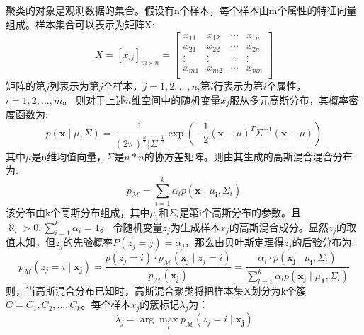 \documentclass[lang=cn,a4paper,cite=authoryear]{elegantpaper}
\begin{document}
\subsection*{}
聚类的对象是观测数据的集合。假设有n个样本，每个样本由m个属性的特征向量组成。样本集合可以表示为矩阵X:
$$
X=\left[ x_{ij} \right] _{m\times n}=\left[ \begin{matrix}
	x_{11}&		x_{12}&		\cdots&		x_{1n}\\
	x_{21}&		x_{22}&		\cdots&		x_{2n}\\
	\vdots&		\vdots&		\ddots&		\vdots\\
	x_{m1}&		x_{m2}&		\cdots&		x_{mn}\\
\end{matrix} \right] 
$$
矩阵的第$j$列表示为第$j$个样本，$j=1,2,...,n$;第$i$行表示为第$i$个属性，$i=1,2,...,m$。
则对于上述$n$维空间中的随机变量$x_j$服从多元高斯分布，其概率密度函数为:
\begin{equation}
	p(\mathbf{x} \mid \mu, \Sigma)=\frac{1}{(2 \pi)^{\frac{n}{2}}|\Sigma|^{\frac{1}{2}}} \exp \left(-\frac{1}{2}(\mathbf{x}-\mu)^{T} \Sigma^{-1}(\mathbf{x}-\mu)\right)
\end{equation}
其中$\mu$是n维均值向量，$\Sigma$是$n*n$的协方差矩阵。则由其生成的高斯混合混合分布为:
\begin{equation}
	p_{\mathcal{M}}=\sum_{i=1}^{k} \alpha_{i} p\left(\mathbf{x} \mid \mu_{\mathbf{i}}, \Sigma_{i}\right)
\end{equation}
该分布由k个高斯分布组成，其中$\mu_i$和$\Sigma_i$是第i个高斯分布的参数。且$\aleph_i>0,\sum_{i=1}^{k} \alpha_{i}=1$。
令随机变量$z_j$为生成样本$x_j$的高斯混合成分。显然$z_j$的取值未知，但$z_j$的先验概率$P(z_j=j)=\alpha_{j}$，那么由贝叶斯定理得$z_j$的后验分布为:
\begin{equation}
	p_{\mathcal{M}}\left(z_{j}=i \mid \mathbf{x}_{\mathbf{j}}\right)=\frac{p\left(z_{j}=i\right) \cdot p_{\mathcal{M}}\left(\mathbf{x}_{\mathbf{j}} \mid z_{j}=i\right)}{p_{\mathcal{M}}\left(\mathbf{x}_{\mathbf{j}}\right)}=\frac{\alpha_{i} \cdot p\left(\mathbf{x}_{\mathbf{j}} \mid \mu_{\mathbf{i}}, \Sigma_{i}\right)}{\sum_{l=1}^{k} \alpha_{l} p\left(\mathbf{x}_{\mathbf{j}} \mid \mu_{\mathbf{1}}, \Sigma_{l}\right)}
\end{equation}
则，当高斯混合分布已知时，高斯混合聚类将把样本集X划分为k个簇$C={C_1,C_2,...,C_k}$。每个样本$x_j$的簇标记$\lambda_j$为：
\begin{equation}
	\lambda_{j}=\arg \max _{i} p_{\mathcal{M}}\left(z_{j}=i \mid \mathbf{x}_{\mathbf{j}}\right)
\end{equation}
\end{document}
